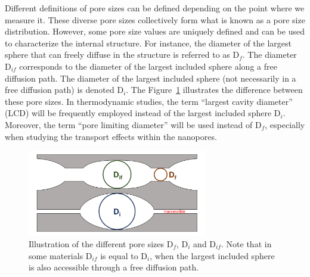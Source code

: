 \documentclass[main.tex]{subfiles}
\begin{document}
Different definitions of pore sizes can be defined depending on the point where we measure it. These diverse pore sizes collectively form what is known as a pore size distribution. However, some pore size values are uniquely defined and can be used to characterize the internal structure. For instance, the diameter of the largest sphere that can freely diffuse in the structure is referred to as D$_f$. The diameter D$_{if}$ corresponds to the diameter of the largest included sphere along a free diffusion path. The diameter of the largest included sphere (not necessarily in a free diffusion path) is denoted D$_i$. The Figure~\ref{fgr:pore_size} illustrates the difference between these pore sizes. In thermodynamic studies, the term ``largest cavity diameter'' (LCD) will be frequently employed instead of the largest included sphere D$_i$. Moreover, the term ``pore limiting diameter'' will be used instead of D$_f$, especially when studying the transport effects within the nanopores.

\begin{figure}[ht]
  \centering
  \includegraphics[width=0.7\textwidth]{figures/2-thermo/pores.pdf}
  \caption{Illustration of the different pore sizes D$_f$, D$_i$ and D$_{if}$. Note that in some materials D$_{if}$ is equal to D$_i$, when the largest included sphere is also accessible through a free diffusion path. }\label{fgr:pore_size}
\end{figure}
\end{document}

